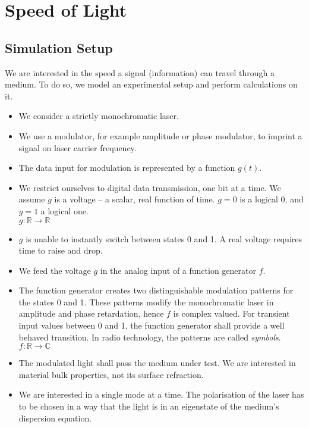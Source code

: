 \documentclass[12pt,a4paper,twoside,openright,BCOR10mm,headsepline,titlepage,abstracton,chapterprefix,final]{scrreprt}
\begin{document}
\section{Speed of Light}

\subsection{Simulation Setup}
We are interested in the speed a signal (information) can travel through a medium.
To do so, we model an experimental setup and perform calculations on it.


\begin{itemize}
 \item We consider a strictly monochromatic laser. 
 \item We use a modulator, for example amplitude or phase modulator, 
       to imprint a signal on laser carrier frequency.
 \item The data input for modulation is represented by a function $g(t)$.
 \item We restrict ourselves to digital data transmission, one bit at a time.
       We assume $g$ is a voltage -- a scalar, real function of time.
       $g=0$ is a logical 0, and $g=1$ a logical one.
       \\
       $g:\mathbb{R}\rightarrow \mathbb{R}$
 \item $g$ is unable to instantly switch between states 0 and 1.
       A real voltage requires time to raise and drop.
 \item We feed the voltage $g$ in the analog input of a function generator $f$.
 \item The function generator creates 
       two distinguishable modulation patterns
       for the states 0 and 1.
       These patterns modify the monochromatic laser in amplitude and phase retardation,
       hence $f$ is complex valued.
       For transient input values between 0 and 1, the function generator
       shall provide a well behaved transition.
       In radio technology, the patterns are called \emph{symbols}.
       \\
       $f:\mathbb{R}\rightarrow \mathbb{C}$
 \item The modulated light shall pass the medium under test.
       We are interested in material bulk properties,
       not its surface refraction.
 \item We are interested in a single mode at a time. 
       The polarisation of the laser has to be chosen in a way 
       that the light is in an eigenstate of the medium's dispersion equation.

\end{itemize}
\end{document}
